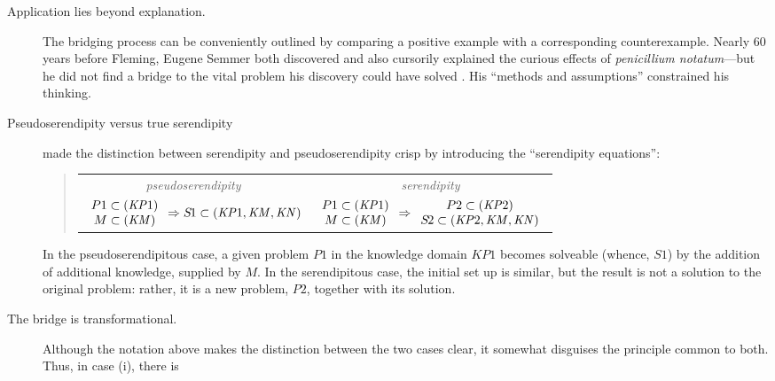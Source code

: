 \begin{description}
\item[Application lies beyond explanation.]
  The bridging process can be
  conveniently outlined by comparing a positive example with a
  corresponding counterexample.  Nearly 60 years before Fleming,
  Eugene Semmer both discovered and also cursorily explained the
  curious effects of \emph{penicillium notatum}---but he did not find
  a bridge to the vital problem his discovery could have solved
  \cite[p.~75]{cropley2013creativity}.  His ``methods and
  assumptions'' \cite[p.~131]{floppyearedrabbits1958barber}
  constrained his thinking.
\item[Pseudoserendipity versus true serendipity]
  \citet[p.~3]{Figueiredo2001} made the distinction between
  serendipity and pseudoserendipity  crisp by introducing
  the ``serendipity equations'':
\begin{quote}
\begin{tabular}{cc}
\emph{pseudoserendipity} & \emph{serendipity}\\
$\begin{array}{c}
P1 \subset (\mathit{KP}1)\\
M \subset (\mathit{KM})
\end{array} \Rightarrow S\hspace{-.12em}1 \subset (\mathit{KP}1, \mathit{KM}, \mathit{KN})$
&
$\begin{array}{c}
P1 \subset (\mathit{KP}1)\\
M \subset (\mathit{KM})
\end{array} \Rightarrow
\begin{array}{c}
P2 \subset (\mathit{KP}2)\\
S\hspace{-.1em}2 \subset (\mathit{KP}2, \mathit{KM}, \mathit{KN})
\end{array}$
\end{tabular}
\end{quote}
In the pseudoserendipitous case, a given problem $P1$ in the knowledge
domain $\mathit{KP}1$ becomes solveable (whence, $S1$) by the addition of
additional knowledge, supplied by $M$.  In the serendipitous case, the
initial set up is similar, but the result is not a solution to the
original problem: rather, it is a new problem, $P2$, together with its
solution.
\item[The bridge is transformational.]  Although the notation above
  makes the distinction between the two cases clear, it somewhat
  disguises the principle common to both.  Thus, in case (i), there is

\end{description}
